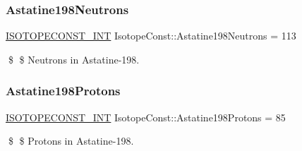 \subsubsection{\texorpdfstring{Astatine198\+Neutrons}{Astatine198Neutrons}}
{\footnotesize\ttfamily \mbox{\hyperlink{group___isotope_const-_macros_ga5f18360b3e99483a35c32d789e62621c}{I\+S\+O\+T\+O\+P\+E\+C\+O\+N\+S\+T\+\_\+\+I\+NT}} Isotope\+Const\+::\+Astatine198\+Neutrons = 113}

\$ \$ Neutrons in Astatine-\/198. \mbox{\label{group___isotope_const-_astatine-_at198_gac14682d81f65506bee79be4ec400ab33}} 
\subsubsection{\texorpdfstring{Astatine198\+Protons}{Astatine198Protons}}
{\footnotesize\ttfamily \mbox{\hyperlink{group___isotope_const-_macros_ga5f18360b3e99483a35c32d789e62621c}{I\+S\+O\+T\+O\+P\+E\+C\+O\+N\+S\+T\+\_\+\+I\+NT}} Isotope\+Const\+::\+Astatine198\+Protons = 85}

\$ \$ Protons in Astatine-\/198. 